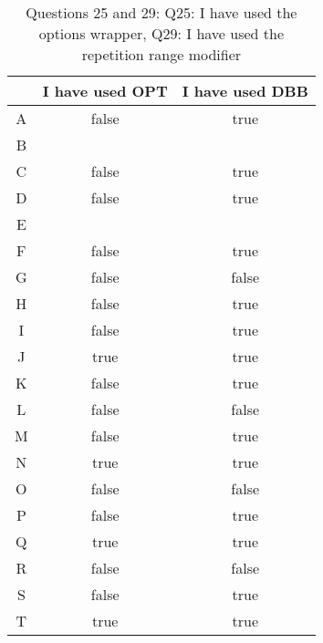 \begin{table}
\centering
\begin{tabular}{|c|c|c|}
\hline
 & I have used OPT & I have used DBB\\
\hline
A & false & true\\
\hline
B &  & \\
\hline
C & false & true\\
\hline
D & false & true\\
\hline
E &  & \\
\hline
F & false & true\\
\hline
G & false & false\\
\hline
H & false & true\\
\hline
I & false & true\\
\hline
J & true & true\\
\hline
K & false & true\\
\hline
L & false & false\\
\hline
M & false & true\\
\hline
N & true & true\\
\hline
O & false & false\\
\hline
P & false & true\\
\hline
Q & true & true\\
\hline
R & false & false\\
\hline
S & false & true\\
\hline
T & true & true\\
\hline
\hline\end{tabular}
\label{table:surveyQ2529}
\caption{\small{Questions 25 and 29: Q25: I have used the options wrapper, Q29: I have used the repetition range modifier }}
\end{table}
